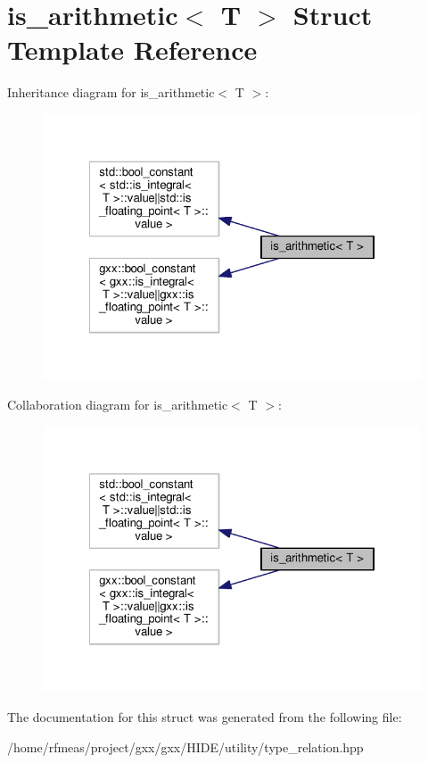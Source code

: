 \hypertarget{structis__arithmetic}{}\section{is\+\_\+arithmetic$<$ T $>$ Struct Template Reference}
\label{structis__arithmetic}


Inheritance diagram for is\+\_\+arithmetic$<$ T $>$\+:
\nopagebreak
\begin{figure}[H]
\begin{center}
\leavevmode
\includegraphics[width=322pt]{structis__arithmetic__inherit__graph}
\end{center}
\end{figure}


Collaboration diagram for is\+\_\+arithmetic$<$ T $>$\+:
\nopagebreak
\begin{figure}[H]
\begin{center}
\leavevmode
\includegraphics[width=322pt]{structis__arithmetic__coll__graph}
\end{center}
\end{figure}


The documentation for this struct was generated from the following file\+:\begin{DoxyCompactItemize}
\item 
/home/rfmeas/project/gxx/gxx/\+H\+I\+D\+E/utility/type\+\_\+relation.\+hpp\end{DoxyCompactItemize}
